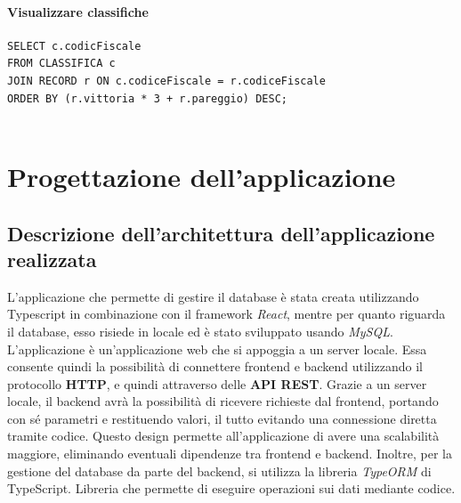 \documentclass[a4paper,12pt]{report}
\begin{document}
\subsubsection{Visualizzare classifiche}
\begin{verbatim}
SELECT c.codicFiscale
FROM CLASSIFICA c
JOIN RECORD r ON c.codiceFiscale = r.codiceFiscale
ORDER BY (r.vittoria * 3 + r.pareggio) DESC;
    
\end{verbatim}

\chapter{Progettazione dell'applicazione}
\section{Descrizione dell'architettura dell'applicazione realizzata}
L'applicazione che permette di gestire il database è stata creata utilizzando Typescript in combinazione con il framework \emph{React}, 
mentre per quanto riguarda il database, esso risiede in locale ed è stato sviluppato usando \emph{MySQL}.
L'applicazione è un'applicazione web che si appoggia a un server locale. Essa consente quindi la possibilità di connettere 
frontend e backend utilizzando il protocollo \textbf{HTTP}, e quindi attraverso delle \textbf{API REST}. Grazie a un server locale, 
il backend avrà la possibilità di ricevere richieste dal frontend, portando con sé parametri e restituendo valori, il tutto 
evitando una connessione diretta tramite codice. Questo design permette all'applicazione di avere una scalabilità maggiore, eliminando 
eventuali dipendenze tra frontend e backend. Inoltre, per la gestione del database da parte del backend, si utilizza la libreria 
\emph{TypeORM} di TypeScript. Libreria che permette di eseguire operazioni sui dati mediante codice.
\end{document}

